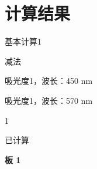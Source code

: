 \documentclass[UTF8,10pt,a4paper,fontset=fandol]{ctexart}
\newcommand{\fieldvalue}[1]{#1}
\begin{document}
\section*{计算结果}

\noindent
\fieldvalue{基本计算1}

\noindent
\fieldvalue{减法}

\noindent
\fieldvalue{吸光度1，波长：450 nm}

\noindent
\fieldvalue{吸光度1，波长：570 nm}

\noindent
\fieldvalue{1}

\noindent
\fieldvalue{已计算}

\medskip

\noindent
\textbf{板 1}
\end{document}
